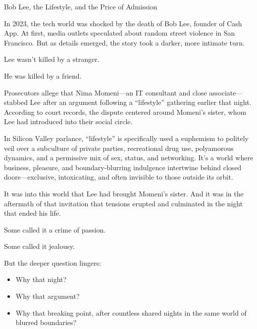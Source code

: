 \begin{HistoricalSidebar}{Bob Lee, the Lifestyle, and the Price of Admission}

  In 2023, the tech world was shocked by the death of Bob Lee, founder of Cash App.  
  At first, media outlets speculated about random street violence in San Francisco.  
  But as details emerged, the story took a darker, more intimate turn.
  
  \medskip
  
  Lee wasn’t killed by a stranger.
  
  \medskip
  
  He was killed by a friend.
  
  \medskip
  
  Prosecutors allege that Nima Momeni—an IT consultant and close associate—stabbed Lee after an argument following 
  a “lifestyle” gathering earlier that night. According to court records, the dispute centered around Momeni’s sister, 
  whom Lee had introduced into their social circle.
  
  \medskip
  
  In Silicon Valley parlance, “lifestyle” is specifically used a euphemism to politely veil over a subculture of private parties, 
  recreational drug use, polyamorous dynamics, and a permissive mix of sex, status, and networking. It’s a world where 
  business, pleasure, and boundary-blurring indulgence intertwine behind closed doors—exclusive, intoxicating, and 
  often invisible to those outside its orbit.
  
  \medskip
  
  It was into this world that Lee had brought Momeni’s sister. And it was in the aftermath of that invitation that 
  tensions erupted and culminated in the night that ended his life.

  \medskip
  
  Some called it a crime of passion.

  \medskip
  
  Some called it jealousy.
  
  \medskip
  
  But the deeper question lingers:

  \medskip
  
  \begin{itemize}
    \item Why that night?
    \item Why that argument?
    \item Why that breaking point, after countless shared nights in the same world of blurred boundaries?
  \end{itemize}
  

\end{HistoricalSidebar}
